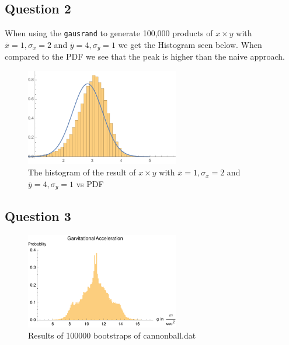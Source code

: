 \documentclass{article}
\begin{document}
\subsection{Question 2}

When using the \texttt{gausrand} to generate 100,000 products of $x\times y$ with $\overline{x}=1,\sigma_x=2$ and $\overline{y}=4,\sigma_y=1$ we get the Histogram seen below. When compared to the PDF we see that the peak is higher than the naive approach.

\begin{figure}[!htb]
	\begin{center}
		\includegraphics[width=0.6\textwidth]{p2a.pdf}
	\end{center}
	\caption{The histogram of the result of $x\times y$ with $\overline{x}=1,\sigma_x=2$ and $\overline{y}=4,\sigma_y=1$ vs PDF}
\label{fig:qual}
\end{figure}
\FloatBarrier

\subsection{Question 3}

\begin{figure}[!htb]
	\begin{center}
		\includegraphics[width=0.6\textwidth]{p3a.pdf}
	\end{center}
	\caption{Results of 100000 bootstraps of cannonball.dat}
\label{fig:qual}
\end{figure}
\FloatBarrier
\end{document}
